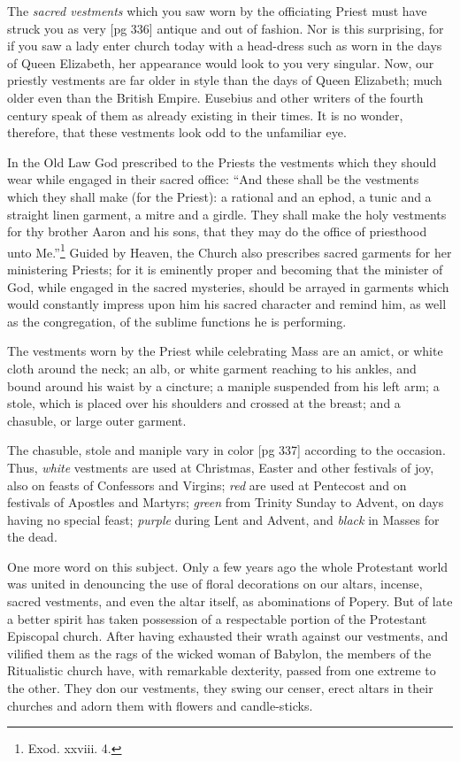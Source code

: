 The \emph{sacred vestments} which you saw worn by
the officiating Priest must have struck you as very
[pg 336]
antique and out of fashion. Nor is this surprising,
for if you saw a lady enter church today with
a head-dress such as worn in the days of Queen
Elizabeth, her appearance would look to you very
singular. Now, our priestly vestments are far
older in style than the days of Queen Elizabeth;
much older even than the British Empire. Eusebius
and other writers of the fourth century speak
of them as already existing in their times. It is
no wonder, therefore, that these vestments look
odd to the unfamiliar eye.

In the Old Law God prescribed to the Priests
the vestments which they should wear while engaged
in their sacred office: “And these shall be
the vestments which they shall make (for the
Priest): a rational and an ephod, a tunic and a
straight linen garment, a mitre and a girdle. They
shall make the holy vestments for thy brother
Aaron and his sons, that they may do the office of
priesthood unto Me.”\footnote{Exod.
xxviii. 4.} Guided by Heaven, the
Church also prescribes sacred garments for her
ministering Priests; for it is eminently proper and
becoming that the minister of God, while engaged
in the sacred mysteries, should be arrayed in garments
which would constantly impress upon him
his sacred character and remind him, as well as
the congregation, of the sublime functions he is
performing.

The vestments worn by the Priest while celebrating
Mass are an amict, or white cloth around
the neck; an alb, or white garment reaching to his
ankles, and bound around his waist by a cincture;
a maniple suspended from his left arm; a stole,
which is placed over his shoulders and crossed at
the breast; and a chasuble, or large outer garment.

The chasuble, stole and maniple vary in color
[pg 337]
according to the occasion. Thus, \emph{white} vestments
are used at Christmas, Easter and other festivals
of joy, also on feasts of Confessors and Virgins;
\emph{red} are used at Pentecost and on festivals of Apostles
and Martyrs; \emph{green} from Trinity Sunday to
Advent, on days having no special feast; \emph{purple}
during Lent and Advent, and \emph{black} in Masses for
the dead.

One more word on this subject. Only a few
years ago the whole Protestant world was united
in denouncing the use of floral decorations on our
altars, incense, sacred vestments, and even the
altar itself, as abominations of Popery. But of
late a better spirit has taken possession of a respectable
portion of the Protestant Episcopal
church. After having exhausted their wrath
against our vestments, and vilified them as the
rags of the wicked woman of Babylon, the members
of the Ritualistic church have, with remarkable
dexterity, passed from one extreme to the
other. They don our vestments, they swing our
censer, erect altars in their churches and adorn
them with flowers and candle-sticks.

